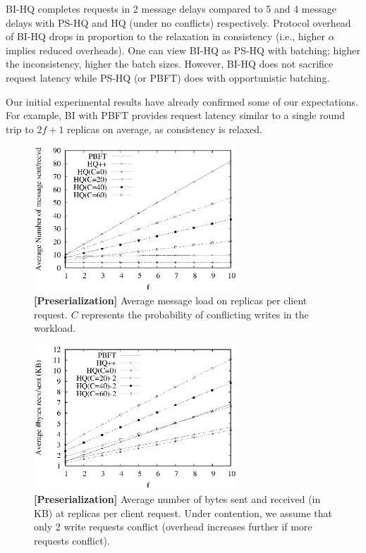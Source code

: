 \documentclass[twocolumn,10pt]{article}
\newcommand{\stitle}[1]{\vspace{2pt}{\bf #1:}}
\begin{document}
\stitle{3. BI-HQ vs PS-HQ} BI-HQ completes requests in 2 message delays compared to 5 and 4
message delays with PS-HQ and HQ (under no conflicts) respectively. 
Protocol overhead of BI-HQ drops in proportion to the relaxation in consistency 
(i.e., higher $\alpha$  implies reduced overheads). One can view BI-HQ as PS-HQ with batching; higher
the inconsistency, higher the batch sizes. However, BI-HQ does not sacrifice request latency while 
PS-HQ (or PBFT) does with opportunistic batching.

Our initial experimental results have already confirmed
some of our expectations. For example, BI with PBFT provides request latency similar to a single round 
trip to $2f+1$ replicas on average,  as consistency is relaxed. 
\begin{figure}
\centering
\includegraphics[width=3in]{graphs/Abs_Mesg_Count_Comp_PBFT_HQ}
\caption{\textbf{[Preserialization]} Average message load on replicas per client
request. $C$ represents the probability of conflicting writes in the workload.
}
\label{fig:abs_mesg_count_comp} \end{figure}

\begin{figure}
\centering
\includegraphics[width=3in]{graphs/Byte_Count_Comp}
\caption{\textbf{[Preserialization]} Average number of bytes sent and received (in KB) at replicas
per client request. Under contention, we assume
that only 2 write requests conflict (overhead increases further if more requests conflict).
}
\label{fig:byte_count_comp}
\end{figure}
\end{document}
